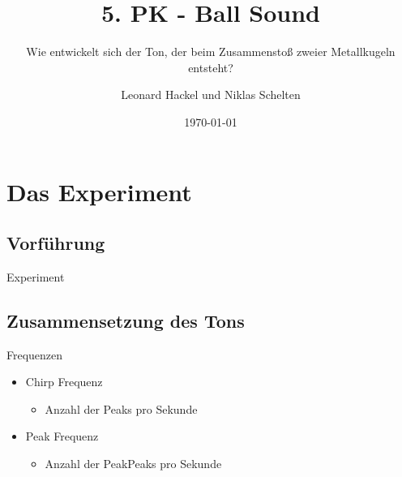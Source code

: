 \documentclass[12pt]{beamer}
\author{Leonard Hackel und Niklas Schelten}
\title{5. PK - Ball Sound}
\subtitle{Wie entwickelt sich der Ton, der beim Zusammenstoß zweier Metallkugeln entsteht?}
\institute{Herder Oberschule Berlin}
\date{\today}
\begin{document}
\begin{frame}
\titlepage
\end{frame}

\begin{frame}
\tableofcontents
\end{frame}

\section{Das Experiment}
\subsection{Vorführung}
\begin{frame}{Experiment}

\end{frame}

\subsection{Zusammensetzung des Tons}
\begin{frame}{}
\end{frame}

\begin{frame}{Frequenzen}
\begin{itemize}
\item<1-> Chirp Frequenz
	\begin{itemize}
	\item<2->[$\rightarrow$] Anzahl der Peaks pro Sekunde
	\end{itemize}
\item<3-> Peak Frequenz
	\begin{itemize}
	\item<4->[$\rightarrow$] Anzahl der PeakPeaks pro Sekunde
	\end{itemize}
\end{itemize}
\end{frame}
\end{document}
